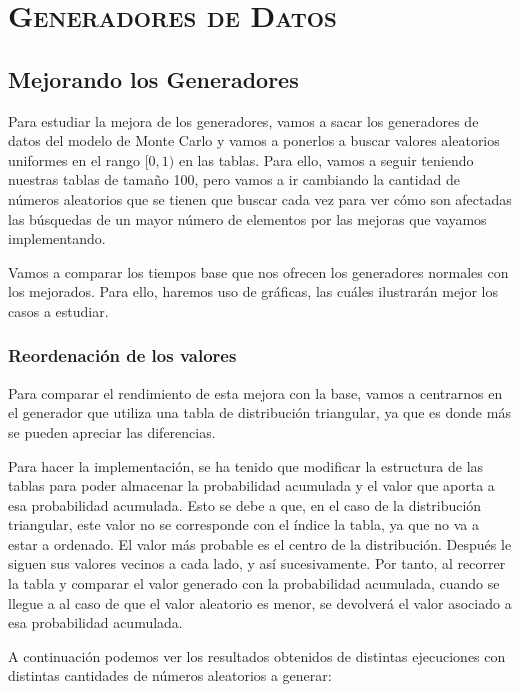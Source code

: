 \documentclass[11pt,a4paper]{report}
\begin{document}
\newpage

\chapter{\textsc{Generadores de Datos}}

\section{Mejorando los Generadores}

Para estudiar la mejora de los generadores, vamos a sacar los generadores de datos del modelo de Monte Carlo y vamos a ponerlos
a buscar valores aleatorios uniformes en el rango $[0, 1)$ en las tablas. Para ello, vamos a seguir teniendo nuestras
tablas de tamaño 100, pero vamos a ir cambiando la cantidad de números aleatorios que se tienen que buscar cada vez
para ver cómo son afectadas las búsquedas de un mayor número de elementos por las mejoras que vayamos implementando.

Vamos a comparar los tiempos base que nos ofrecen los generadores normales con los mejorados. Para ello, haremos uso de gráficas,
las cuáles ilustrarán mejor los casos a estudiar.

\subsection{Reordenación de los valores}

Para comparar el rendimiento de esta mejora con la base, vamos a centrarnos en el generador que utiliza una tabla de distribución
triangular, ya que es donde más se pueden apreciar las diferencias.

Para hacer la implementación, se ha tenido que modificar la estructura de las tablas para poder almacenar la probabilidad acumulada
y el valor que aporta a esa probabilidad acumulada. Esto se debe a que, en el caso de la distribución triangular, este valor no
se corresponde con el índice la tabla, ya que no va a estar a ordenado. El valor más probable es el centro de la distribución.
Después le siguen sus valores vecinos a cada lado, y así sucesivamente. Por tanto, al recorrer la tabla y comparar el valor
generado con la probabilidad acumulada, cuando se llegue a al caso de que el valor aleatorio es menor, se devolverá el valor
asociado a esa probabilidad acumulada.

A continuación podemos ver los resultados obtenidos de distintas ejecuciones con distintas cantidades de números aleatorios a
generar:
\end{document}

